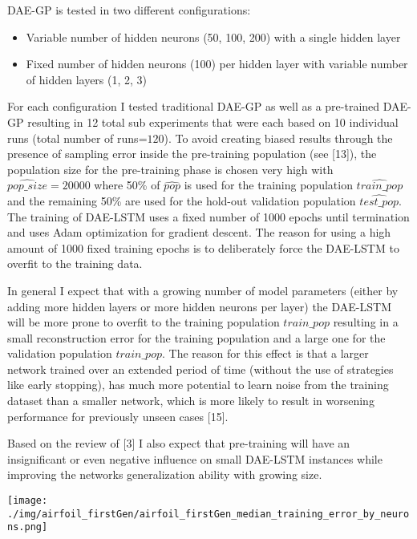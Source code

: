 \documentclass[
  11pt,
]{article}
\providecommand{\tightlist}{%
  \setlength{\itemsep}{0pt}\setlength{\parskip}{0pt}}
\let\origfigure\figure
\let\endorigfigure\endfigure
\renewenvironment{figure}[1][2] {
    \expandafter\origfigure\expandafter[H]
} {
    \endorigfigure
}
\begin{document}
DAE-GP is tested in two different configurations:

\begin{itemize}
\tightlist
\item
  Variable number of hidden neurons (50, 100, 200) with a single hidden
  layer
\item
  Fixed number of hidden neurons (100) per hidden layer with variable
  number of hidden layers (1, 2, 3)
\end{itemize}

For each configuration I tested traditional DAE-GP as well as a
pre-trained DAE-GP resulting in 12 total sub experiments that were each
based on 10 individual runs (total number of runs=\(120\)). To avoid
creating biased results through the presence of sampling error inside
the pre-training population (see {[}13{]}), the population size for the
pre-training phase is chosen very high with \(\hat{pop\_size}=20000\)
where 50\% of \(\hat{pop}\) is used for the training population
\(\hat{train\_pop}\) and the remaining 50\% are used for the hold-out
validation population \(\hat{test\_pop}\). The training of DAE-LSTM uses
a fixed number of 1000 epochs until termination and uses Adam
optimization for gradient descent. The reason for using a high amount of
1000 fixed training epochs is to deliberately force the DAE-LSTM to
overfit to the training data.

In general I expect that with a growing number of model parameters
(either by adding more hidden layers or more hidden neurons per layer)
the DAE-LSTM will be more prone to overfit to the training population
\(train\_pop\) resulting in a small reconstruction error for the
training population and a large one for the validation population
\(train\_pop\). The reason for this effect is that a larger network
trained over an extended period of time (without the use of strategies
like early stopping), has much more potential to learn noise from the
training dataset than a smaller network, which is more likely to result
in worsening performance for previously unseen cases {[}15{]}.

Based on the review of {[}3{]} I also expect that pre-training will have
an insignificant or even negative influence on small DAE-LSTM instances
while improving the networks generalization ability with growing size.

\begin{figure}
\centering
\texttt{[image: ./img/airfoil\_firstGen/airfoil\_firstGen\_median\_training\_error\_by\_neurons.png]}
\caption{Airfoil - First Generation Median Training Error for variable
number of hidden Neurons}
\end{figure}
\end{document}
